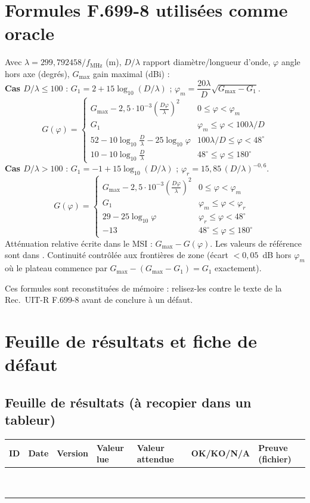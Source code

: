 \section{Formules F.699-8 utilisées comme oracle}\label{sec:f699}
Avec $\lambda=299{,}792458/f_{\mathrm{MHz}}$ (m), $D/\lambda$ rapport diamètre/longueur d'onde, $\varphi$ angle hors axe (degrés), $G_{\max}$ gain maximal (dBi) :\\[2pt]
\textbf{Cas $D/\lambda\le100$} : $G_1=2+15\log_{10}(D/\lambda)$ ; $\varphi_m=\dfrac{20\lambda}{D}\sqrt{G_{\max}-G_1}$.
\[G(\varphi)=\begin{cases}G_{\max}-2{,}5\cdot10^{-3}\left(\frac{D\varphi}{\lambda}\right)^2&0\le\varphi<\varphi_m\\ G_1&\varphi_m\le\varphi<100\lambda/D\\ 52-10\log_{10}\frac D\lambda-25\log_{10}\varphi&100\lambda/D\le\varphi<48^\circ\\ 10-10\log_{10}\frac D\lambda&48^\circ\le\varphi\le180^\circ\end{cases}\]
\textbf{Cas $D/\lambda>100$} : $G_1=-1+15\log_{10}(D/\lambda)$ ; $\varphi_r=15{,}85\,(D/\lambda)^{-0{,}6}$.
\[G(\varphi)=\begin{cases}G_{\max}-2{,}5\cdot10^{-3}\left(\frac{D\varphi}{\lambda}\right)^2&0\le\varphi<\varphi_m\\ G_1&\varphi_m\le\varphi<\varphi_r\\ 29-25\log_{10}\varphi&\varphi_r\le\varphi<48^\circ\\ -13&48^\circ\le\varphi\le180^\circ\end{cases}\]
Atténuation relative écrite dans le MSI : $G_{\max}-G(\varphi)$. Les valeurs de référence sont dans . Continuité contrôlée aux frontières de zone (écart $<0{,}05$~dB hors $\varphi_m$ où le plateau commence par $G_{\max}-(G_{\max}-G_1)=G_1$ exactement).
\begin{alerte}Ces formules sont reconstituées de mémoire : relisez-les contre le texte de la Rec.\ UIT-R F.699-8 avant de conclure à un défaut.\end{alerte}

\section{Feuille de résultats et fiche de défaut}\label{sec:fiche}
\subsection*{Feuille de résultats (à recopier dans un tableur)}
\begin{center}\small\begin{tabular}{@{}|p{1.5cm}|p{1.9cm}|p{1.5cm}|p{2.1cm}|p{2.2cm}|p{2.1cm}|p{2.8cm}|@{}}\hline
\textbf{ID} & \textbf{Date} & \textbf{Version} & \textbf{Valeur lue} & \textbf{Valeur attendue} & \textbf{OK/KO/N/A} & \textbf{Preuve (fichier)}\\\hline\ \\[3mm]\hline\ \\[3mm]\hline\end{tabular}\end{center}
